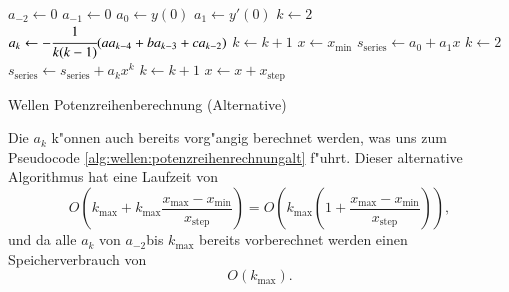 \begin{algorithm}
	\begin{algorithmic}[1]
		\State $a_{-2} \gets 0$
		\State $a_{-1} \gets 0$
		\State $a_0 \gets y(0)$
		\State $a_1 \gets y'(0)$
		\State $k \gets 2$
			\State $a_k \gets -\cfrac{1}{k(k-1)} (aa_{k-4}+ba_{k-3}+ca_{k-2})$
			\State $k \gets k + 1$
		\EndFor
		\State $x \gets x_{\text{min}}$
			\State $s_{\text{series}} \gets a_0 + a_1x$
			\State $k \gets 2$
				\State $s_{\text{series}} \gets s_{\text{series}} + a_k x^k$
				\State $k \gets k + 1$
			\EndFor
			\State $x \gets x + x_{\text{step}}$
		\EndFor
	\end{algorithmic}
	\caption{Wellen Potenzreihenberechnung (Alternative)}
	\label{alg:wellen:potenzreihenrechnungalt}
\end{algorithm}

Die $a_k$ k"onnen auch bereits vorg"angig berechnet werden, was uns zum 
Pseudocode \ref{alg:wellen:potenzreihenrechnungalt} f"uhrt. Dieser 
alternative Algorithmus hat eine Laufzeit von
\begin{equation*}
	O
	\left(k_{\text{max}} + 
		k_{\text{max}}\frac{x_{\text{max}}-x_{\text{min}}}{x_{\text{step}}}
	\right)
	=
	O
	\left(
		k_{\text{max}}
		\left(
			1+\frac{x_{\text{max}}-x_{\text{min}}}{x_{\text{step}}}
		\right)
	\right),
\end{equation*}
und da alle $a_k$ von $a_{-2}$bis $k_{\text{max}}$ bereits vorberechnet werden 
einen Speicherverbrauch von
\begin{equation*}
	O
	\left(
		k_{\text{max}}
	\right).
\end{equation*}